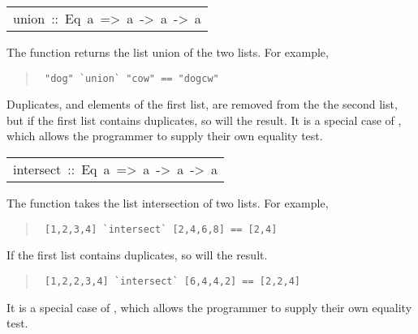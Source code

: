 \begin{haddockdesc}
\item[\begin{tabular}{@{}l}
union\ ::\ Eq\ a\ =>\ {\char 91}a{\char 93}\ ->\ {\char 91}a{\char 93}\ ->\ {\char 91}a{\char 93}
\end{tabular}]\haddockbegindoc
The  function returns the list union of the two lists.
 For example,
\par
\begin{quote}
{\haddockverb\begin{verbatim}
 "dog" `union` "cow" == "dogcw"
\end{verbatim}}
\end{quote}
Duplicates, and elements of the first list, are removed from the
 the second list, but if the first list contains duplicates, so will
 the result.
 It is a special case of , which allows the programmer to supply
 their own equality test.
\par

\end{haddockdesc}
\begin{haddockdesc}
\item[\begin{tabular}{@{}l}
intersect\ ::\ Eq\ a\ =>\ {\char 91}a{\char 93}\ ->\ {\char 91}a{\char 93}\ ->\ {\char 91}a{\char 93}
\end{tabular}]\haddockbegindoc
The  function takes the list intersection of two lists.
 For example,
\par
\begin{quote}
{\haddockverb\begin{verbatim}
 [1,2,3,4] `intersect` [2,4,6,8] == [2,4]
\end{verbatim}}
\end{quote}
If the first list contains duplicates, so will the result.
\par
\begin{quote}
{\haddockverb\begin{verbatim}
 [1,2,2,3,4] `intersect` [6,4,4,2] == [2,2,4]
\end{verbatim}}
\end{quote}
It is a special case of , which allows the programmer to
 supply their own equality test.
\par

\end{haddockdesc}
